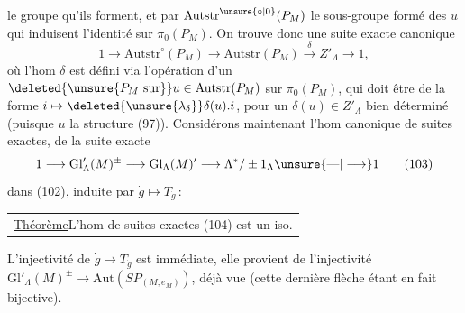 le groupe qu'ils forment, et par $\mathrm{Autstr}^{\unsure{\circ|0}}(P_M)$ le sous-groupe formé des $u$ qui induisent l'identité sur $\pi_0(P_M)$. On trouve donc une suite exacte canonique
\[
1\longrightarrow\mathrm{Autstr}^\circ(P_M)\longrightarrow\mathrm{Autstr}(P_M)\xrightarrow{\delta} Z'_\Lambda\longrightarrow1,\tag*{(102)}
\]
où l'hom $\delta$ est défini via l'opération d'un $\deleted{\unsure{P_M\ \mathrm{sur}}}u\in\mathrm{Autstr}(P_M)$ sur $\pi_0(P_M)$, qui doit être de la forme $i\mapsto\deleted{\unsure{\lambda_\delta}}\delta(u).i$, pour un $\delta(u)\in Z'_\Lambda$ bien déterminé (puisque $u$  la structure (97)). Considérons maintenant l'hom canonique de suites exactes,  de la suite exacte
\[
1\longrightarrow\mathrm{Gl}'_\Lambda(M)^\pm\longrightarrow\mathrm{Gl}_\Lambda(M)'\longrightarrow\Lambda^*/\pm1_\Lambda\unsure{\text{---}|\longrightarrow}1\tag*{(103)}
\]
dans (102), induite par $\dot g\mapsto T_{\dot g}$\,:


\noindent\begin{tabular}{|p{.91\linewidth}}
\uline{Théorème}\quad L'hom de suites exactes (104) est un iso.
\end{tabular}

L'injectivité de $\dot g\mapsto T_{\dot g}$ est immédiate, elle provient de l'injectivité  $\mathrm{Gl}'_\Lambda(M)^\pm\longrightarrow\mathrm{Aut}(SP_{(M,e_M)})$, déjà vue (cette dernière flèche étant en fait bijective).
